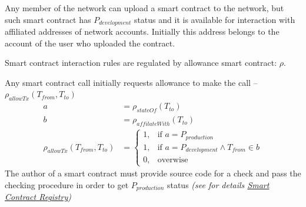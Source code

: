 \documentclass[12pt]{report}
\newcommand{\hlc}[1]{\colorbox{yellow!25}{#1}}
\begin{document}
Any member of the network can upload a smart contract to the network, but such smart contract has $P_{development}$ status and it is available for interaction with affiliated addresses of network accounts. Initially this address belongs to the account of the user who uploaded the contract.

Smart contract interaction rules are regulated by allowance smart contract: $\rho$.

Any smart contract call initially requests allowance to make the call – $\rho_{allowTx}(T_{from}, T_{to})$
\begin{align}
a &= \rho_{stateOf}(T_{to}) \nonumber\\
b &= \rho_{affilateWith}(T_{to}) \nonumber\\
\rho_{allowTx}(T_{from}, T_{to}) &= \begin{cases}1, & \text{if } a = P_{production} \\ 1, & \text{if } a = P_{development} \wedge T_{from} \in b \\ 0, & \text{overwise} \end{cases}
\end{align}
The author of a smart contract must provide source code for a check and pass the checking procedure in order to get $P_{production}$ status \textit{(see for details \hyperref[tech-apps-contracts-registry]{Smart Contract Registry})}

\def\Owner{Владелец контракта}
\def\Blockchain{Блокчейн}
\def\Registry{Реестр контрактов}
\def\LoadByteCode{Uploading byte code to blockchain}
\def\LoadSourceCode{Uploading source code}
\def\ValidationEnded{Code \hlc{Validation is} passed?}
\def\ChangeStatus{Changing smart contract state}
\end{document}

